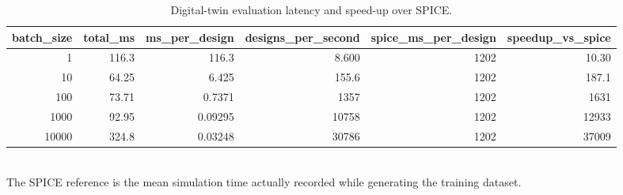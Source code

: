 \begin{table}[!t]
\centering
\caption{Digital-twin evaluation latency and speed-up over SPICE.}
\label{tab:twin_benchmark_main}
\footnotesize
\begin{tabular}{rrrrrr}
\toprule
batch\_size & total\_ms & ms\_per\_design & designs\_per\_second & spice\_ms\_per\_design & speedup\_vs\_spice \\
\midrule
1 & 116.3 & 116.3 & 8.600 & 1202 & 10.30 \\
10 & 64.25 & 6.425 & 155.6 & 1202 & 187.1 \\
100 & 73.71 & 0.7371 & 1357 & 1202 & 1631 \\
1000 & 92.95 & 0.09295 & 10758 & 1202 & 12933 \\
10000 & 324.8 & 0.03248 & 30786 & 1202 & 37009 \\
\bottomrule
\end{tabular}
\\[2pt] \footnotesize The SPICE reference is the mean simulation time actually recorded while generating the training dataset.
\end{table}
